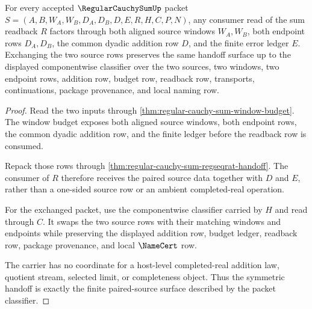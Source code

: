 \begin{theorem}
\label{thm:regular-cauchy-sum-symmetric-input-handoff}
For every accepted $\RegularCauchySumUp$ packet $S=(A,B,W_A,W_B,D_A,D_B,D,E,R,H,C,P,N)$, any consumer read of the sum readback $R$ factors through both aligned source windows $W_A,W_B$, both endpoint rows $D_A,D_B$, the common dyadic addition row $D$, and the finite error ledger $E$. Exchanging the two source rows preserves the same handoff surface up to the displayed componentwise classifier over the two sources, two windows, two endpoint rows, addition row, budget row, readback row, transports, continuations, package provenance, and local naming row.
\end{theorem}
\begin{proof}
Read the two inputs through \autoref{thm:regular-cauchy-sum-window-budget}. The window budget exposes both aligned source windows, both endpoint rows, the common dyadic addition row, and the finite ledger before the readback row is consumed.

Repack those rows through \autoref{thm:regular-cauchy-sum-regseqrat-handoff}. The consumer of $R$ therefore receives the paired source data together with $D$ and $E$, rather than a one-sided source row or an ambient completed-real operation.

For the exchanged packet, use the componentwise classifier carried by $H$ and read through $C$. It swaps the two source rows with their matching windows and endpoints while preserving the displayed addition row, budget ledger, readback row, package provenance, and local $\NameCert$ row.

The carrier has no coordinate for a host-level completed-real addition law, quotient stream, selected limit, or completeness object. Thus the symmetric handoff is exactly the finite paired-source surface described by the packet classifier.
\end{proof}

